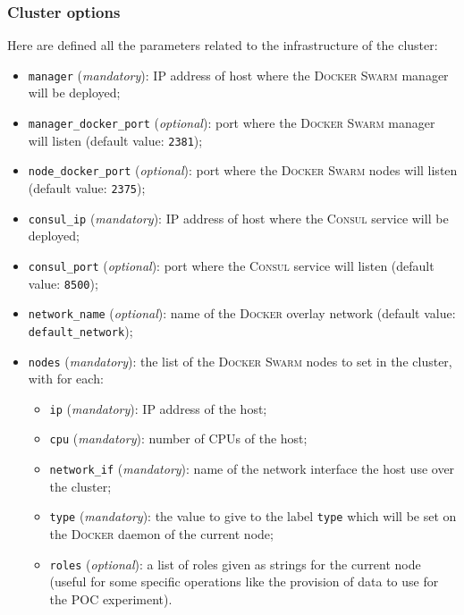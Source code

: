 \subsubsection{Cluster options}

Here are defined all the parameters related to the infrastructure of the cluster:

\begin{itemize}
  \item \texttt{manager} (\emph{mandatory}): IP address of host where the \textsc{Docker Swarm} manager will be deployed;
  \item \texttt{manager\_docker\_port} (\emph{optional}): port where the \textsc{Docker Swarm} manager will listen (default value: \texttt{2381});
  \item \texttt{node\_docker\_port} (\emph{optional}): port where the \textsc{Docker Swarm} nodes will listen (default value: \texttt{2375});
  \item \texttt{consul\_ip} (\emph{mandatory}): IP address of host where the \textsc{Consul} service will be deployed;
  \item \texttt{consul\_port} (\emph{optional}): port where the \textsc{Consul} service will listen (default value: \texttt{8500});
  \item \texttt{network\_name} (\emph{optional}): name of the \textsc{Docker} overlay network (default value: \texttt{default\_network});
  \item \texttt{nodes} (\emph{mandatory}): the list of the \textsc{Docker Swarm} nodes to set in the cluster, with for each:
  \begin{itemize}
    \item \texttt{ip} (\emph{mandatory}): IP address of the host;
    \item \texttt{cpu} (\emph{mandatory}): number of CPUs of the host;
    \item \texttt{network\_if} (\emph{mandatory}): name of the network interface the host use over the cluster;
    \item \texttt{type} (\emph{mandatory}): the value to give to the label \texttt{type} which will be set on the \textsc{Docker} daemon of the current node;
    \item \texttt{roles} (\emph{optional}): a list of roles given as strings for the current node (useful for some specific operations like the provision of data to use for the POC experiment).
  \end{itemize}
\end{itemize}

